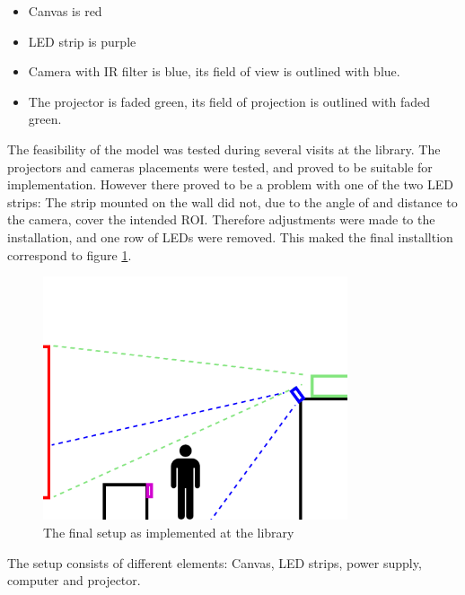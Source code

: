 \begin{itemize}
\item Canvas is red
\item LED strip is purple
\item Camera with IR filter is blue, its field of view is outlined with blue.
\item The projector is faded green, its field of projection is outlined with faded green.
\end{itemize}

The feasibility of the model was tested during several visits at the library. The projectors and cameras placements were tested, and proved to be suitable for implementation. However there proved to be a problem with one of the two LED strips: The strip mounted on the wall did not, due to the angle of and distance to the camera, cover the intended ROI. Therefore adjustments were made to the installation, and one row of LEDs were removed. This maked the final installtion correspond to figure \ref{fig:setup_model_final}.

\begin{figure}[htbp] 
\centering 
\includegraphics[width=0.8\textwidth]{Pictures/Setup/sideview_camera_with_person.png} 
\caption{The final setup as implemented at the library} 
\label{fig:setup_model_final} 
\end{figure}

The setup consists of different elements: Canvas, LED strips, power supply, computer and projector.


